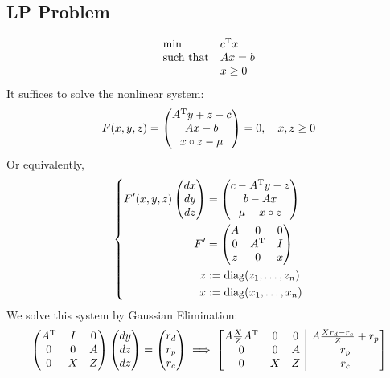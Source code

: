 \subsection{LP Problem}
\[
\begin{array}{ll}
\min&c^{\mathrm T} x\\
\mbox{such that}&Ax=b\\
&x\ge0
\end{array}
\]
It suffices to solve the nonlinear system:
\[
F(x,y,z)=\begin{pmatrix}
A^{\mathrm T} y+z-c\\Ax-b\\x\circ z-\mu
\end{pmatrix}=0,\quad x,z\ge0
\]
Or equivalently,
\[
\left\{
\begin{aligned}
F'(x,y,z)\begin{pmatrix}
dx\\dy\\dz
\end{pmatrix}&=\begin{pmatrix}
c-A^{\mathrm T} y-z\\
b-Ax\\
\mu-x\circ z
\end{pmatrix}\\
F'&=\begin{pmatrix}
A&0&0\\0&A^{\mathrm T}&I\\z&0&x
\end{pmatrix}\\
z&:=\operatorname{diag}(z_1,\dots,z_n)\\
x&:=\operatorname{diag}(x_1,\dots,x_n)
\end{aligned}\right.
\]
We solve this system by Gaussian Elimination:
\[
\begin{pmatrix}
A\trans&I&0\\0&0&A\\0&X&Z
\end{pmatrix}\begin{pmatrix}
dy\\dz\\dz
\end{pmatrix}=\begin{pmatrix}
r_d\\r_p\\r_c
\end{pmatrix}\implies
\left[
\begin{array}{@{}ccc|c@{}}
A\frac{X}{Z} A\trans&0&0&A\frac{Xr_d-r_c}{Z}+r_p\\
0&0&A&r_p\\
0&X&Z&r_c
\end{array} \right]
\]
